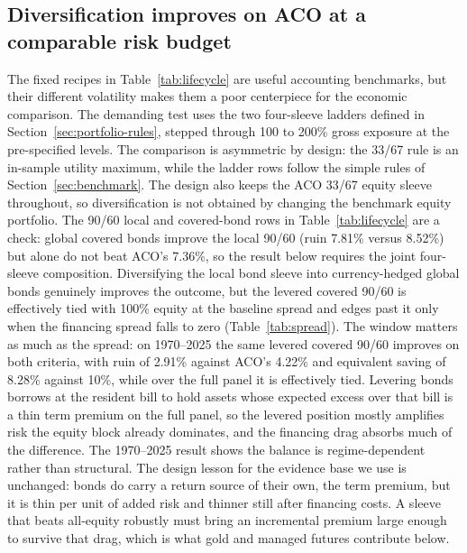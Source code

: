 \documentclass[11pt]{article}
\begin{document}
\subsection{Diversification improves on ACO at a comparable risk budget}
\label{sec:leverage-ladders-main}

The fixed recipes in Table~\ref{tab:lifecycle} are useful accounting benchmarks,
but their different volatility makes them a poor centerpiece for the economic
comparison. The demanding test uses the two four-sleeve ladders defined in
Section~\ref{sec:portfolio-rules}, stepped through 100 to 200\% gross exposure
at the pre-specified levels. The comparison is
asymmetric by design: the 33/67 rule is an in-sample utility maximum, while the
ladder rows follow the simple rules of Section~\ref{sec:benchmark}. The design also keeps the ACO 33/67
equity sleeve throughout, so diversification is not obtained by changing the
benchmark equity portfolio. The 90/60 local and covered-bond rows
in Table~\ref{tab:lifecycle} are a check: global covered bonds improve the local
90/60 (ruin 7.81\% versus 8.52\%) but alone do not beat ACO's 7.36\%, so the
result below requires the joint four-sleeve composition.
Diversifying the local bond sleeve into currency-hedged global bonds genuinely
improves the outcome, but the levered covered 90/60 is effectively
tied with 100\% equity at the baseline spread and edges past it
only when the financing spread falls to zero (Table~\ref{tab:spread}). The
window matters as much as the spread: on 1970--2025 the same levered covered
90/60 improves on both criteria, with ruin of 2.91\% against ACO's 4.22\% and
equivalent saving of 8.28\% against 10\%, while over the full panel it is
effectively tied. Levering
bonds borrows at the resident bill to hold assets whose expected excess over
that bill is a thin term premium on the full panel, so the levered position
mostly amplifies risk
the equity block already dominates, and the financing drag absorbs much of the
difference. The 1970--2025 result shows the balance is regime-dependent rather
than structural. The design lesson for the evidence base we use is unchanged:
bonds do carry a return source of their own, the term premium, but it is thin
per unit of added risk and thinner still after financing costs. A sleeve that
beats all-equity robustly must bring an incremental premium large enough to
survive that drag, which is what gold and managed
futures contribute below.
\end{document}
